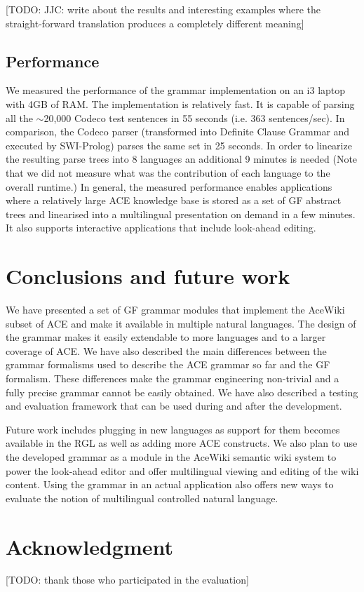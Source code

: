\documentclass[a4paper]{article}
\begin{document}
[TODO: JJC: write about the results and
interesting examples where the straight-forward translation produces
a completely different meaning]


\subsection{Performance}

We measured the performance of the grammar implementation on an i3 laptop
with 4GB of RAM.
The implementation is relatively fast. It is capable of parsing
all the $\sim$20,000 Codeco test sentences in 55 seconds
(i.e. 363 sentences/sec). In comparison, the Codeco parser (transformed into
Definite Clause Grammar and executed by SWI-Prolog) parses
the same set in 25 seconds.
In order to linearize the
resulting parse trees into 8 languages an additional 9 minutes is needed
(Note that we did not measure what was
the contribution of each language to the overall runtime.)
In general,
the measured performance enables applications where a relatively large ACE
knowledge base is stored as a set of GF abstract trees and linearised into a
multilingual presentation on demand in a few minutes. It also supports
interactive applications that include look-ahead editing.

\section{Conclusions and future work}
\label{section:Conclusions}

We have presented a set of GF grammar modules that implement the AceWiki
subset of ACE and make it available in multiple natural languages. The design
of the grammar makes it easily extendable to more languages and to a larger
coverage of ACE.
We have also described the main differences between the grammar formalisms
used to describe the ACE grammar so far and the GF formalism.
These differences make the grammar engineering non-trivial and a fully
precise grammar cannot be easily obtained.
We have also described a testing and evaluation framework that can be used
during and after the development.

Future work includes plugging in new languages as support for them becomes
available in the RGL as well as adding more ACE constructs. We also plan
to use the developed grammar as a module in the AceWiki semantic wiki system
to power the look-ahead editor and offer multilingual viewing and editing
of the wiki content. Using the grammar in an actual application also offers
new ways to evaluate the notion of multilingual controlled natural language.

\section*{Acknowledgment}

[TODO: thank those who participated in the evaluation]



%
\end{document}
